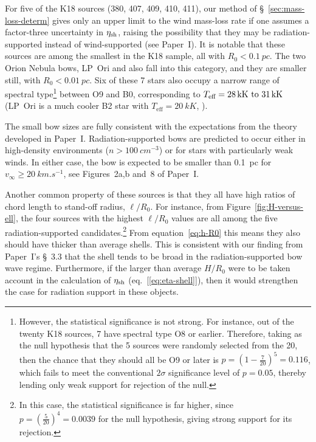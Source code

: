 For five of the K18 sources (380, 407, 409, 410, 411), our method of
\S~\ref{sec:mass-loss-determ} gives only an upper limit to the wind
mass-loss rate if one assumes a factor-three uncertainty in
\(\eta_{\text{sh}}\), raising the possibility that they may be
radiation-supported instead of wind-supported (see Paper~I).  It is
notable that these sources are among the smallest in the K18 sample,
all with \(R_0 < \SI{0.1}{pc}\).  The two Orion Nebula bows, LP~Ori
and \thD{} also fall into this category, and they are smaller still,
with \(R_0 < \SI{0.01}{pc}\).  Six of these 7 stars also occupy a
narrow range of spectral type\footnote{%
  However, the statistical significance is not strong.  For
  instance, out of the twenty K18 sources, 7 have spectral type O8 or
  earlier.  Therefore, taking as the null hypothesis that the 5
  sources were randomly selected from the 20, then the chance that
  they should all be O9 or later is
  \(p = (1 - \frac{7}{20})^5 = 0.116\), which fails to meet the
  conventional \(2\sigma\) significance level of \(p = 0.05\),
  thereby lending only weak support for rejection of the null.} %
between O9 and B0, corresponding to
\(T_{\text{eff}} = \text{\SIrange{28}{31}{kK}}\) (LP~Ori is a much
cooler B2 star with \(T_{\text{eff}} = \SI{20}{kK}\),
\citealp{Petit:2008a, Alecian:2013a}).

The small bow sizes are fully consistent with the expectations from
the theory developed in Paper~I.  Radiation-supported bows are predicted
to occur either in high-density environments
(\(n > \SI{100}{cm^{-3}}\)) or for stars with particularly weak winds.
In either case, the bow is expected to be smaller than \SI{0.1}{pc}
for \(v_\infty \ge \SI{20}{km.s^{-1}}\), see Figures~2a,b and~8 of
Paper~I.\@

Another common property of these sources is that they all have high
ratios of chord length to stand-off radius, \(\ell/R_0\).  For
instance, from Figure~\ref{fig:H-versus-ell}, the four sources with
the highest \(\ell/R_0\) values are all among the five
radiation-supported candidates.\footnote{%
  In this case, the statistical significance is far higher, since
  \(p = (\frac{5}{20})^4 = 0.0039\) for the null hypothesis, giving
  strong support for its rejection.}  From equation~\eqref{eq:h-R0}
this means they also should have thicker than average shells.  This is
consistent with our finding from Paper~I's \S~3.3 that the shell tends
to be broad in the radiation-supported bow wave regime.  Furthermore,
if the larger than average \(H/R_0\) were to be taken account in the
calculation of \(\eta_{\text{sh}}\) (eq.~[\ref{eq:eta-shell}]), then it
would strengthen the case for radiation support in these objects.


